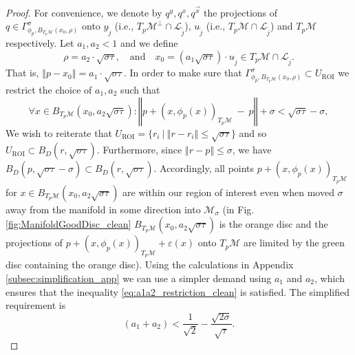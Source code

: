 \documentclass[12pt]{article}
\theoremstyle{remark}
\newcommand{\MM}{\mathcal{M}}
\newcommand{\LL}{\mathcal{L}}
\newcommand{\eps}{\varepsilon}
\newcommand{\norm}[1]{\left\Vert #1 \right\Vert}
\begin{document}
\begin{appendices}
\begin{proof}
For convenience, we denote by $q^y, q^x, q^{\vec x}$ the projections of $q\in \Gamma_{\phi_p, B_{T_p\MM}(x_0, \rho)}^\sigma$ onto $y_{\tilde j}$ (i.e., $T_p\MM^\perp\cap \LL_{\tilde j}$), $u_{\tilde j}$ (i.e., $T_p\MM\cap \LL_{\tilde j}$) and $T_p\MM$ respectively.
Let $a_1, a_2<1$ and we define 
\[\rho = a_2 \cdot\sqrt{\sigma\tau}, ~~~\mbox{ and }~~~
x_0 = (a_1\sqrt{\sigma\tau})\cdot u_{\tilde j}\in T_p\MM \cap \LL_{\tilde j}.\]
That is, 
$
\norm{p - x_0} = a_1 \cdot \sqrt{\sigma\tau}
$.
In order to make sure that $\Gamma^\sigma_{\phi_p, B_{T_p\MM}(x_0, \rho)}\subset U_{\textrm{ROI}}$ we restrict the choice of $a_1, a_2$ such that
\begin{equation}\label{eq:a1a2_restriction_clean}
    \forall x\in B_{T_p\MM}(x_0, a_2\sqrt{\sigma\tau}): \norm{p+(x,\phi_p(x))_{T_p\MM} ~-~ p}
    + \sigma < \sqrt{\sigma\tau} - \sigma
,\end{equation}
We wish to reiterate that $U_\textrm{ROI} = \{r_i ~|~ \norm{r - r_i}\leq \sqrt{\sigma \tau}\}$ and so $U_\textrm{ROI}\subset B_D(r, \sqrt{\sigma\tau})$.
Furthermore, since $\norm{r - p}\leq \sigma$, we have $B_D(p, \sqrt{\sigma\tau} - \sigma)\subset  B_D(r, \sqrt{\sigma\tau})$.
Accordingly, all points $p+(x, \phi_p(x))_{T_p\MM}$ for  $x\in B_{T_p\MM}(x_0, a_2 \sqrt{\sigma\tau})$ are within our region of interest even when moved $\sigma$ away from the manifold in some direction into $\MM_\sigma$ (in Fig. \ref{fig:ManifoldGoodDisc_clean}  $B_{T_p\MM}(x_0, a_2\sqrt{\sigma\tau})$ is the orange disc and the projections of $p+(x, \phi_p(x))_{T_p\MM} + \eps(x)$ onto $T_p\MM$ are limited by the green disc containing the orange disc).
Using the calculations in Appendix \ref{subsec:simplification_app} we can use a simpler demand using $a_1$ and $a_2$, which ensures that the inequality \eqref{eq:a1a2_restriction_clean} is satisfied. The simplified requirement is
\begin{equation}\label{eq:a1a2_simplification_clean}
    (a_1+a_2)<\frac{1}{\sqrt{2}} -\frac{\sqrt{2\sigma}}{\sqrt{\tau}}
.\end{equation}


\end{proof}
\end{appendices}
\end{document}

